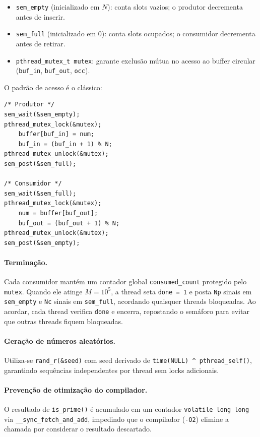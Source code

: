 \documentclass[12pt,a4paper]{article}
\begin{document}
\begin{itemize}
    \item \texttt{sem\_empty} (inicializado em $N$): conta slots vazios;
          o produtor decrementa antes de inserir.
    \item \texttt{sem\_full}  (inicializado em $0$): conta slots ocupados;
          o consumidor decrementa antes de retirar.
    \item \texttt{pthread\_mutex\_t mutex}: garante exclusão mútua no acesso
          ao buffer circular (\texttt{buf\_in}, \texttt{buf\_out}, \texttt{occ}).
\end{itemize}

O padrão de acesso é o clássico:

\begin{lstlisting}
/* Produtor */
sem_wait(&sem_empty);
pthread_mutex_lock(&mutex);
    buffer[buf_in] = num;
    buf_in = (buf_in + 1) % N;
pthread_mutex_unlock(&mutex);
sem_post(&sem_full);

/* Consumidor */
sem_wait(&sem_full);
pthread_mutex_lock(&mutex);
    num = buffer[buf_out];
    buf_out = (buf_out + 1) % N;
pthread_mutex_unlock(&mutex);
sem_post(&sem_empty);
\end{lstlisting}

\paragraph{Terminação.}
Cada consumidor mantém um contador global \texttt{consumed\_count} protegido
pelo \texttt{mutex}. Quando ele atinge $M = 10^5$, a thread seta
\texttt{done = 1} e posta \texttt{Np} sinais em \texttt{sem\_empty} e
\texttt{Nc} sinais em \texttt{sem\_full}, acordando quaisquer threads
bloqueadas. Ao acordar, cada thread verifica \texttt{done} e encerra,
repostando o semáforo para evitar que outras threads fiquem bloqueadas.

\paragraph{Geração de números aleatórios.}
Utiliza-se \texttt{rand\_r(\&seed)} com seed derivado de
\texttt{time(NULL) \^{} pthread\_self()}, garantindo sequências independentes
por thread sem locks adicionais.

\paragraph{Prevenção de otimização do compilador.}
O resultado de \texttt{is\_prime()} é acumulado em um contador
\texttt{volatile long long} via \texttt{\_\_sync\_fetch\_and\_add},
impedindo que o compilador (\texttt{-O2}) elimine a chamada por considerar
o resultado descartado.
\end{document}
